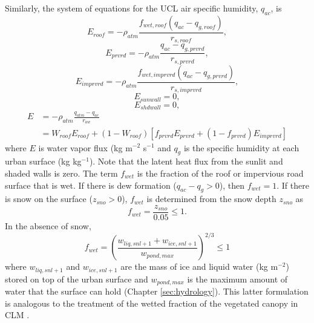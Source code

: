 \documentclass[12pt,authoryear]{elsarticle}
\numberwithin{equation}{section} %
\begin{document}
Similarly, the system of equations for the UCL air specific humidity, $q_{ac}$, is
\begin{equation}
\label{water_vapor_flux_roof}
E_{roof}=-\rho_{atm}\frac{f_{wet,roof}(q_{ac}-q_{g,roof})}{r_{s,roof}},
\end{equation}
\begin{equation}
E_{prvrd}=-\rho_{atm}\frac{q_{ac}-q_{g,prvrd}}{r_{s,prvrd}},
\end{equation}
\begin{equation}
\label{water_vapor_flux_imprvrd}
E_{imprvrd}=-\rho_{atm}\frac{f_{wet,imprvrd}(q_{ac}-q_{g,prvrd})}{r_{s,imprvrd}},
\end{equation}
\begin{equation}
E_{sunwall} = 0,
\end{equation}
\begin{equation}
\label{water_vapor_flux_shdwall}
E_{shdwall} = 0,
\end{equation}
\begin{equation}
\begin{aligned}
E&=-\rho_{atm}\frac{q_{atm}-q_{ac}}{r_{aw}} \\
&=W_{roof}E_{roof}+(1-W_{roof})\left[f_{prvrd}E_{prvrd}+(1-f_{prvrd})E_{imprvrd}\right]
\end{aligned}
\end{equation}
where $E$ is water vapor flux (kg m$^{-2}$ s$^{-1}$ and $q_{g}$ is the specific humidity at each urban surface (kg kg$^{-1}$). Note that the latent heat flux from the sunlit and shaded walls is zero. The term $f_{wet}$ is the fraction of the roof or impervious road surface that is wet. If there is dew formation ($q_{ac}-q_{g}>0$), then $f_{wet}=1$. If there is snow on the surface ($z_{sno}>$0), $f_{wet}$ is determined from the snow depth $z_{sno}$ as
\begin{equation}
f_{wet} = \frac{z_{sno}}{0.05}\leq1.
\end{equation}
In the absence of snow,
\begin{equation}
f_{wet} = \left(\frac{w_{liq,snl+1}+w_{ice,snl+1}}{w_{pond,max}}\right)^{2/3}\leq1
\end{equation}
where $w_{liq,snl+1}$ and $w_{ice,snl+1}$ are the mass of ice and liquid water (kg m$^{-2}$) stored on top of the urban surface and $w_{pond,max}$ is the maximum amount of water that the surface can hold (Chapter \ref{sec:hydrology}). This latter formulation is analogous to the treatment of the wetted fraction of the vegetated canopy in CLM \citep{olesonTechnicalDescriptionCommunity2004}.
\end{document}
